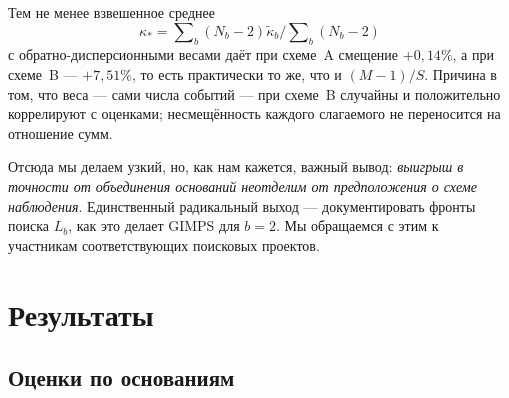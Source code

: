 \documentclass[11pt,a4paper]{article}
\theoremstyle{plain}
\theoremstyle{remark}
\begin{document}
Тем не менее взвешенное среднее
$$\kappa_\ast=\sum\nolimits_b(N_b-2)\tilde\kappa_b\Big/\sum\nolimits_b(N_b-2)$$
с обратно-дисперсионными весами даёт при схеме~A смещение $+0{,}14\%$,
а при схеме~B --- $+7{,}51\%$, то есть практически то же, что и $(M-1)/S$. Причина в том, что веса --- сами числа событий ---
при схеме~B случайны и положительно коррелируют с оценками; несмещённость каждого
слагаемого не переносится на отношение сумм.

Отсюда мы делаем узкий, но, как нам кажется, важный вывод: \emph{выигрыш в точности от
объединения оснований неотделим от предположения о схеме наблюдения}.
Единственный радикальный выход --- документировать фронты поиска $L_b$, как это делает
GIMPS для $b=2$. Мы обращаемся с этим к участникам соответствующих поисковых проектов.

\section{Результаты}\label{sec:results}

\subsection{Оценки по основаниям}
\end{document}
